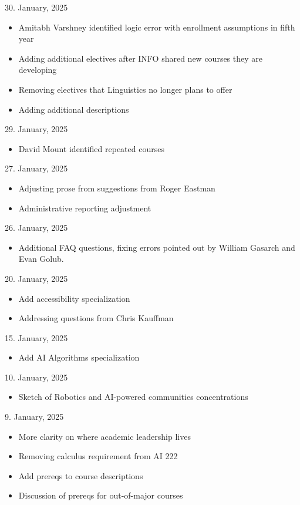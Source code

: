 
30. January, 2025
\begin{itemize}
  \item Amitabh Varshney identified logic error with enrollment assumptions in fifth year
  \item Adding additional electives after INFO shared new courses they are developing
  \item Removing electives that Linguistics no longer plans to offer 
  \item Adding additional descriptions
\end{itemize}

29. January, 2025
\begin{itemize}
  \item David Mount identified repeated courses
\end{itemize}

27. January, 2025
\begin{itemize}
    \item Adjusting prose from suggestions from Roger Eastman
    \item Administrative reporting adjustment
\end{itemize}

26. January, 2025
\begin{itemize}
  \item Additional FAQ questions, fixing errors pointed out by William Gasarch and Evan Golub.
\end{itemize}

20. January, 2025
\begin{itemize}
 \item Add accessibility specialization
 \item Addressing questions from Chris Kauffman
\end{itemize}

15. January, 2025
\begin{itemize}
\item Add AI Algorithms specialization
\end{itemize}

10. January, 2025
\begin{itemize}
  \item Sketch of Robotics and AI-powered communities concentrations
\end{itemize}

9. January, 2025

\begin{itemize}
  \item More clarity on where academic leadership lives
  \item Removing calculus requirement from AI 222
  
  \item Add prereqs to course descriptions
  \item Discussion of prereqs for out-of-major courses
\end{itemize}

